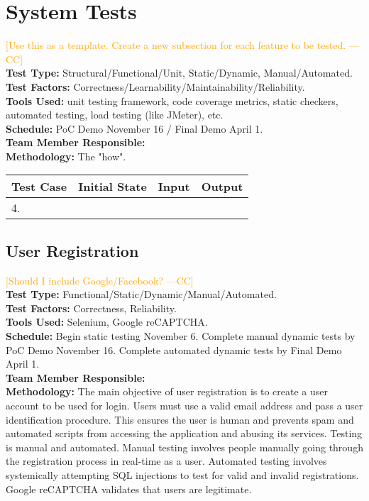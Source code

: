 \documentclass[12pt]{article}
\newcommand{\authornote}[3]{\textcolor{#1}{[#3 ---#2]}}
\newcommand{\authornote}[3]{}
\newcommand{\cc}[1]{\authornote{orange}{CC}{#1}}
\begin{document}
\section{System Tests}

\cc{Use this as a template. Create a new subsection for each feature to be tested.}\\
\textbf{Test Type:} Structural/Functional/Unit, Static/Dynamic, Manual/Automated. \\
\textbf{Test Factors:} Correctness/Learnability/Maintainability/Reliability. \\
\textbf{Tools Used:} unit testing framework, code coverage metrics, static checkers, automated testing, load testing (like JMeter), etc. \\ 
\textbf{Schedule:} PoC Demo November 16 / Final Demo April 1. \\
\textbf{Team Member Responsible:} \\
\textbf{Methodology:} The "how".

\begin{longtable}{|p{2cm}|p{3cm}|p{5cm}|p{5cm}|}
\hline
\textbf{Test Case}  & \textbf{Initial State} & \textbf{Input} & \textbf{Output} \\ \hline
4. & & &  \\ 
\hline
\end{longtable}



\subsection{User Registration} \cc{Should I include Google/Facebook?}\\
\textbf{Test Type:} Functional/Static/Dynamic/Manual/Automated. \\
\textbf{Test Factors:} Correctness, Reliability. \\
\textbf{Tools Used:} Selenium, Google reCAPTCHA. \\
\textbf{Schedule:} Begin static testing November 6. Complete manual dynamic tests by PoC Demo November 16. Complete automated dynamic tests by Final Demo April 1. \\
\textbf{Team Member Responsible:} \\
\textbf{Methodology:} The main objective of user registration is to create a user account to be used for login. Users must use a valid email address and pass a user identification procedure. This ensures the user is human and prevents spam and automated scripts from accessing the application and abusing its services. Testing is manual and automated. Manual testing involves people manually going through the registration process in real-time as a user. Automated testing involves systemically attempting SQL injections to test for valid and invalid registrations. Google reCAPTCHA validates that users are legitimate.
\end{document}
